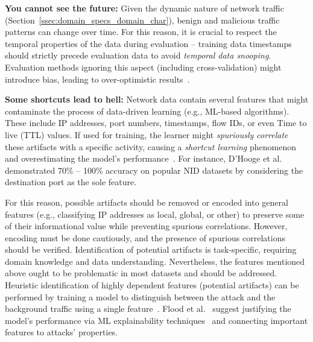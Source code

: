 \textbf{You cannot see the future:} Given the dynamic nature of network traffic (Section~\ref{ssec:domain_specs_domain_char}), benign and malicious traffic patterns can change over time. For this reason, it is crucial to respect the temporal properties of the data during evaluation -- training data timestamps should strictly precede evaluation data to avoid \emph{temporal data snooping}. Evaluation methods ignoring this aspect (including cross-validation) might introduce bias, leading to over-optimistic results~\cite{arp2022_dos_donts_ml_security,pendlebury2019_tesseract}.

\textbf{Some shortcuts lead to hell:} Network data contain several features that might contaminate the process of data-driven learning (e.g., ML-based algorithms). These include IP addresses, port numbers, timestamps, flow IDs, or even Time to live (TTL) values. If used for training, the learner might \emph{spuriously correlate} these artifacts with a specific activity, causing a \emph{shortcut learning} phenomenon~\cite{geirhos2020_shortcut_learning} and overestimating the model's performance~\cite{arp2022_dos_donts_ml_security,catillo2023_ml_public_ids_datasets}. For instance, D'Hooge et al.~\cite{dhooge2022_contaminating_metadata_ml_nids} demonstrated 70\% -- 100\% accuracy on popular NID datasets by considering the destination port as the sole feature.

For this reason, possible artifacts should be removed or encoded into general features (e.g., classifying IP addresses as local, global, or other) to preserve some of their informational value while preventing spurious correlations. However, encoding must be done cautiously, and the presence of spurious correlations should be verified. Identification of potential artifacts is task-specific, requiring domain knowledge and data understanding. Nevertheless, the features mentioned above ought to be problematic in most datasets and should be addressed. Heuristic identification of highly dependent features (potential artifacts) can be performed by training a model to distinguish between the attack and the background traffic using a single feature~\cite{flood2024_bad_design_smells_nids_datasets}. Flood et al.~\cite{flood2024_bad_design_smells_nids_datasets} suggest justifying the model's performance via ML explainability techniques~\cite{nadeem2023_sok_explainable_ml_security,jacobs2022_aiml_network_sec} and connecting important features to attacks' properties.

